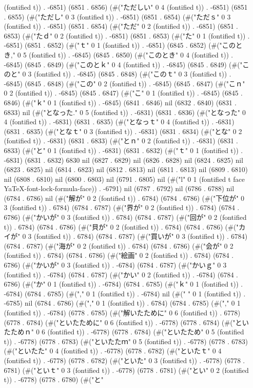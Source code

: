 (fontified t)) . -6851) (6851 . 6856) (#("ただしい" 0 4 (fontified t)) . -6851) (6851 . 6855) (#("ただし" 0 3 (fontified t)) . -6851) (6851 . 6854) (#("ただｓ" 0 3 (fontified t)) . -6851) (6851 . 6854) (#("ただ" 0 2 (fontified t)) . -6851) (6851 . 6853) (#("たｄ" 0 2 (fontified t)) . -6851) (6851 . 6853) (#("た" 0 1 (fontified t)) . -6851) (6851 . 6852) (#("ｔ" 0 1 (fontified t)) . -6851) (6845 . 6852) (#("このとき," 0 5 (fontified t)) . -6845) (6845 . 6850) (#("このとき" 0 4 (fontified t)) . -6845) (6845 . 6849) (#("このとｋ" 0 4 (fontified t)) . -6845) (6845 . 6849) (#("このと" 0 3 (fontified t)) . -6845) (6845 . 6848) (#("このｔ" 0 3 (fontified t)) . -6845) (6845 . 6848) (#("この" 0 2 (fontified t)) . -6845) (6845 . 6847) (#("こｎ" 0 2 (fontified t)) . -6845) (6845 . 6847) (#("こ" 0 1 (fontified t)) . -6845) (6845 . 6846) (#("ｋ" 0 1 (fontified t)) . -6845) (6841 . 6846) nil (6832 . 6840) (6831 . 6833) nil (#("となった." 0 5 (fontified t)) . -6831) (6831 . 6836) (#("となった" 0 4 (fontified t)) . -6831) (6831 . 6835) (#("となっｔ" 0 4 (fontified t)) . -6831) (6831 . 6835) (#("となｔ" 0 3 (fontified t)) . -6831) (6831 . 6834) (#("とな" 0 2 (fontified t)) . -6831) (6831 . 6833) (#("とｎ" 0 2 (fontified t)) . -6831) (6831 . 6833) (#("と" 0 1 (fontified t)) . -6831) (6831 . 6832) (#("ｔ" 0 1 (fontified t)) . -6831) (6831 . 6832) 6830 nil (6827 . 6829) nil (6826 . 6828) nil (6824 . 6825) nil (6823 . 6825) nil (6814 . 6823) nil (6812 . 6813) nil (6811 . 6813) nil (6809 . 6810) nil (6808 . 6810) nil (6800 . 6803) nil (6791 . 6805) nil (#("l" 0 1 (fontified t face YaTeX-font-lock-formula-face)) . -6791) nil (6787 . 6792) nil (6786 . 6788) nil (6784 . 6786) nil (#("解が" 0 2 (fontified t)) . 6784) (6784 . 6786) (#("下位が" 0 3 (fontified t)) . 6784) (6784 . 6787) (#("界が" 0 2 (fontified t)) . 6784) (6784 . 6786) (#("かいが" 0 3 (fontified t)) . 6784) (6784 . 6787) (#("回が" 0 2 (fontified t)) . 6784) (6784 . 6786) (#("貝が" 0 2 (fontified t)) . 6784) (6784 . 6786) (#("カイが" 0 3 (fontified t)) . 6784) (6784 . 6787) (#("買いが" 0 3 (fontified t)) . 6784) (6784 . 6787) (#("海が" 0 2 (fontified t)) . 6784) (6784 . 6786) (#("会が" 0 2 (fontified t)) . 6784) (6784 . 6786) (#("絵画" 0 2 (fontified t)) . 6784) (6784 . 6786) (#("かいが" 0 3 (fontified t)) . -6784) (6784 . 6787) (#("かいｇ" 0 3 (fontified t)) . -6784) (6784 . 6787) (#("かい" 0 2 (fontified t)) . -6784) (6784 . 6786) (#("か" 0 1 (fontified t)) . -6784) (6784 . 6785) (#("ｋ" 0 1 (fontified t)) . -6784) (6784 . 6785) (#("," 0 1 (fontified t)) . -6784) nil (#(" " 0 1 (fontified t)) . -6785) nil (6784 . 6786) (#("," 0 1 (fontified t)) . 6784) (6784 . 6785) (#("," 0 1 (fontified t)) . -6784) (6778 . 6785) (#("解いたために" 0 6 (fontified t)) . 6778) (6778 . 6784) (#("といたために" 0 6 (fontified t)) . -6778) (6778 . 6784) (#("といたためｎ" 0 6 (fontified t)) . -6778) (6778 . 6784) (#("といたため" 0 5 (fontified t)) . -6778) (6778 . 6783) (#("といたたｍ" 0 5 (fontified t)) . -6778) (6778 . 6783) (#("といたた" 0 4 (fontified t)) . -6778) (6778 . 6782) (#("といたｔ" 0 4 (fontified t)) . -6778) (6778 . 6782) (#("といた" 0 3 (fontified t)) . -6778) (6778 . 6781) (#("といｔ" 0 3 (fontified t)) . -6778) (6778 . 6781) (#("とい" 0 2 (fontified t)) . -6778) (6778 . 6780) (#("と" 